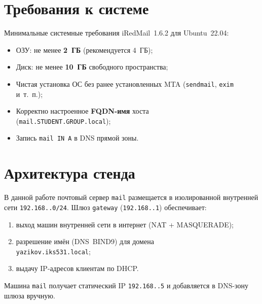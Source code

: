 \section{Требования к системе}

Минимальные системные требования iRedMail~1.6.2 для Ubuntu~22.04:
\begin{itemize}
  \item ОЗУ: не менее \textbf{2~ГБ} (рекомендуется 4~ГБ);
  \item Диск: не менее \textbf{10~ГБ} свободного пространства;
  \item Чистая установка ОС без ранее установленных MTA
        (\texttt{sendmail}, \texttt{exim} и~т.~п.);
  \item Корректно настроенное \textbf{FQDN-имя} хоста\\ (\texttt{mail.STUDENT.GROUP.local});
  \item Запись \texttt{mail~IN~A} в DNS прямой зоны.
\end{itemize}

\section{Архитектура стенда}

В данной работе почтовый сервер \texttt{mail} размещается в изолированной
внутренней сети \texttt{192.168.\cfgLabStudentN.0/24}.
Шлюз \texttt{gateway} (\texttt{192.168.\cfgLabStudentN.1}) обеспечивает:
\begin{enumerate}
  \item выход машин внутренней сети в интернет (NAT + MASQUERADE);
  \item разрешение имён (DNS~BIND9) для домена\\
        \texttt{yazikov.iks531.local};
  \item выдачу IP-адресов клиентам по DHCP.
\end{enumerate}

Машина \texttt{mail} получает статический IP \texttt{192.168.\cfgLabStudentN.5}
и добавляется в DNS-зону шлюза вручную.

\endinput
